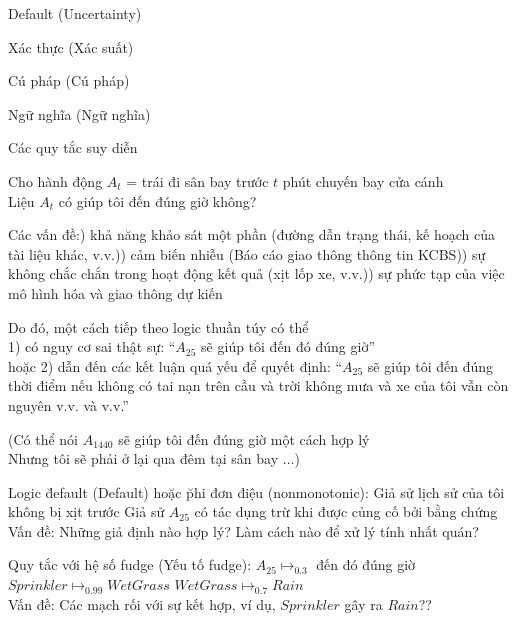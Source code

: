 \documentclass[fleqn]{article}
\begin{document}
\begin{huge}


\blob Default (Uncertainty)

\blob Xác thực (Xác suất)

\blob Cú pháp (Cú pháp)

\blob Ngữ nghĩa (Ngữ nghĩa)

\blob Các quy tắc suy diễn



Cho hành động $A_t$ = trái đi sân bay trước $t$ phút chuyến bay cửa cánh\\
Liệu $A_t$ có giúp tôi đến đúng giờ không?

Các vấn đề:) khả năng khảo sát một phần (đường dẫn trạng thái, kế hoạch của tài liệu khác, v.v.)) cảm biến nhiễu (Báo cáo giao thông thông tin KCBS)) sự không chắc chắn trong hoạt động kết quả (xịt lốp xe, v.v.)) sự phức tạp của việc mô hình hóa và giao thông dự kiến

Do đó, một cách tiếp theo logic thuần túy có thể\\
\phantom{or }1) có nguy cơ sai thật sự: ``$A_{25}$ sẽ giúp tôi đến đó đúng giờ''\\
hoặc 2) dẫn đến các kết luận quá yếu để quyết định:\nl
``$A_{25}$ sẽ giúp tôi đến đúng thời điểm nếu không có tai nạn trên cầu\nl
và trời không mưa và xe của tôi vẫn còn nguyên v.v. và v.v.''

(Có thể nói $A_{1440}$ sẽ giúp tôi đến đúng giờ một cách hợp lý\\
Nhưng tôi sẽ phải ở lại qua đêm tại sân bay $\ldots$)




Logic \u{default (Default)} hoặc \u{phi đơn điệu (nonmonotonic)}:\al
  Giả sử lịch sử của tôi không bị xịt trước\al
  Giả sử $A_{25}$ có tác dụng trừ khi được củng cố bởi bằng chứng \\
Vấn đề: Những giả định nào hợp lý? Làm cách nào để xử lý tính nhất quán?

\u{ Quy tắc với hệ số fudge (Yếu tố fudge)}:\al
$A_{25} \mapsto_{0.3}$ đến đó đúng giờ\al
$Sprinkler \mapsto_{0.99} WetGrass$\al
$WetGrass \mapsto_{0.7} Rain$\\
Vấn đề: Các mạch rối với sự kết hợp, ví dụ, $Sprinkler$ gây ra $Rain$??


\end{huge}
\end{document}
